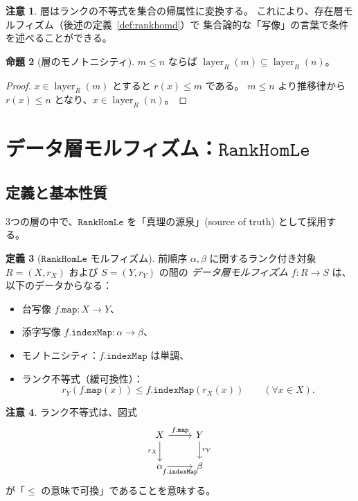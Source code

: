 \documentclass[11pt,a4paper,ja=standard]{bxjsarticle}
\theoremstyle{definition}
\newtheorem{definition}{定義}[section]
\newtheorem{proposition}[definition]{命題}
\newtheorem{remark}[definition]{注意}
\newcommand{\layer}{\operatorname{layer}}
\newcommand{\RankHomLe}{\mathtt{RankHomLe}}
\begin{document}
\begin{remark}
層はランクの不等式を集合の帰属性に変換する。
これにより、存在層モルフィズム（後述の定義~\ref{def:rankhomd}）で
集合論的な「写像」の言葉で条件を述べることができる。
\end{remark}

\begin{proposition}[層のモノトニシティ]
$m \le n$ ならば $\layer_R(m) \subseteq \layer_R(n)$。
\end{proposition}

\begin{proof}
$x \in \layer_R(m)$ とすると $r(x) \le m$ である。
$m \le n$ より推移律から $r(x) \le n$ となり、$x \in \layer_R(n)$。
\end{proof}

\section{データ層モルフィズム：\texorpdfstring{$\RankHomLe$}{RankHomLe}}

\subsection{定義と基本性質}

3つの層の中で、$\RankHomLe$ を「真理の源泉」(source of truth) として採用する。

\begin{definition}[$\RankHomLe$ モルフィズム]\label{def:rankhomle}
前順序 $\alpha, \beta$ に関するランク付き対象 $R = (X, r_X)$ および $S = (Y, r_Y)$ の間の
\emph{データ層モルフィズム} $f : R \to S$ は、以下のデータからなる：
\begin{itemize}
\item 台写像 $f.\mathtt{map} : X \to Y$、
\item 添字写像 $f.\mathtt{indexMap} : \alpha \to \beta$、
\item モノトニシティ：$f.\mathtt{indexMap}$ は単調、
\item ランク不等式（緩可換性）：
\[
  r_Y(f.\mathtt{map}(x)) \le f.\mathtt{indexMap}(r_X(x))
  \qquad (\forall x \in X).
\]
\end{itemize}
\end{definition}

\begin{remark}
ランク不等式は、図式
\[
\begin{tikzcd}
X \arrow[r, "f.\mathtt{map}"] \arrow[d, "r_X"'] & Y \arrow[d, "r_Y"] \\
\alpha \arrow[r, "f.\mathtt{indexMap}"'] & \beta
\end{tikzcd}
\]
が「$\le$ の意味で可換」であることを意味する。
\end{remark}
\end{document}

